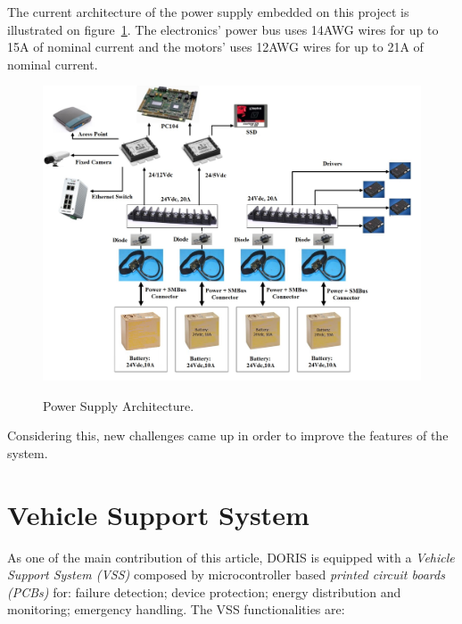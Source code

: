 \documentclass{ifacconf}
\begin{document}
The current architecture of the power supply embedded on this project is
illustrated on figure~\ref{fig:DiagramaSAM}. The electronics' power bus uses
14AWG wires for up to 15A of nominal current and the motors' uses
12AWG wires for up to 21A of nominal current.

\begin{figure}[ht]
\centering
    \includegraphics[angle=90,width=1\columnwidth]{figs/DiagramaSAM.jpg}  %
    \label{fig:DiagramaSAM}
\caption{Power Supply Architecture.}\vspace{-0.25cm}
\end{figure}

Considering this, new challenges came up in order to improve the features of
the system.

\section{Vehicle Support System}\label{sec:VSS}

As one of the main contribution of this article, DORIS is equipped with a
\emph{Vehicle Support System (VSS)} composed by microcontroller based
\emph{printed circuit boards (PCBs)} for: failure detection; device protection;
energy distribution and monitoring; emergency handling. The VSS functionalities
are:
  
\end{document}
